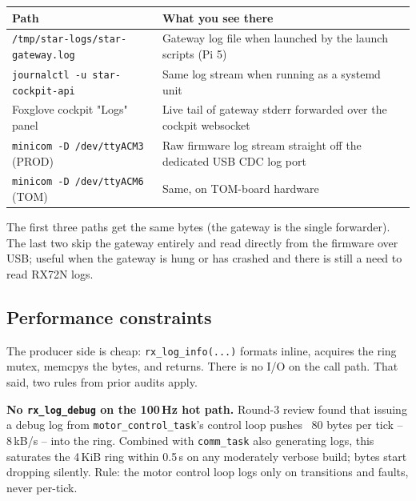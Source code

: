 \begin{center}
\begin{tabular}{|p{5.5cm}|p{8.0cm}|}
\hline
\textbf{Path}                                          & \textbf{What you see there}                                                              \\
\hline
\texttt{/tmp/star-logs/star-gateway.log}               & Gateway log file when launched by the launch scripts (Pi 5)                              \\
\texttt{journalctl -u star-cockpit-api}                & Same log stream when running as a systemd unit                                            \\
Foxglove cockpit "Logs" panel                          & Live tail of gateway stderr forwarded over the cockpit websocket                          \\
\texttt{minicom -D /dev/ttyACM3} (PROD)                & Raw firmware log stream straight off the dedicated USB CDC log port                       \\
\texttt{minicom -D /dev/ttyACM6} (TOM)                 & Same, on TOM-board hardware                                                              \\
\hline
\end{tabular}
\end{center}

The first three paths get the same bytes (the gateway is the single
forwarder). The last two skip the gateway entirely and read directly
from the firmware over USB; useful when the gateway is hung or has
crashed and there is still a need to read RX72N logs.

\subsection{Performance constraints}

The producer side is cheap: \texttt{rx\_log\_info(...)} formats
inline, acquires the ring mutex, memcpys the bytes, and returns. There
is no I/O on the call path. That said, two rules from prior audits
apply.

\textbf{No \texttt{rx\_log\_debug} on the 100\,Hz hot path.} Round-3
review found that issuing a debug log from
\texttt{motor\_control\_task}'s control loop pushes ~80 bytes per
tick -- 8\,kB/s -- into the ring. Combined with \texttt{comm\_task}
also generating logs, this saturates the 4\,KiB ring within 0.5\,s on
any moderately verbose build; bytes start dropping silently. Rule:
the motor control loop logs only on transitions and faults, never
per-tick.

